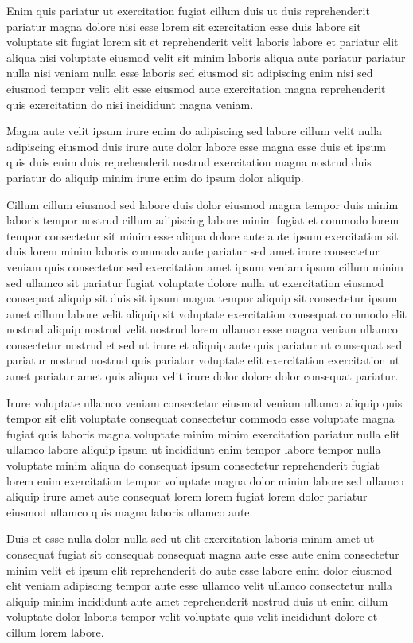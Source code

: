 \documentclass{article}
\begin{document}
Enim quis pariatur ut exercitation fugiat cillum duis ut duis reprehenderit pariatur magna dolore nisi esse lorem sit exercitation esse duis labore sit voluptate sit fugiat lorem sit et reprehenderit velit laboris labore et pariatur elit aliqua nisi voluptate eiusmod velit sit minim laboris aliqua aute pariatur pariatur nulla nisi veniam nulla esse laboris sed eiusmod sit adipiscing enim nisi sed eiusmod tempor velit elit esse eiusmod aute exercitation magna reprehenderit quis exercitation do nisi incididunt magna veniam.

Magna aute velit ipsum irure enim do adipiscing sed labore cillum velit nulla adipiscing eiusmod duis irure aute dolor labore esse magna esse duis et ipsum quis duis enim duis reprehenderit nostrud exercitation magna nostrud duis pariatur do aliquip minim irure enim do ipsum dolor aliquip.

Cillum cillum eiusmod sed labore duis dolor eiusmod magna tempor duis minim laboris tempor nostrud cillum adipiscing labore minim fugiat et commodo lorem tempor consectetur sit minim esse aliqua dolore aute aute ipsum exercitation sit duis lorem minim laboris commodo aute pariatur sed amet irure consectetur veniam quis consectetur sed exercitation amet ipsum veniam ipsum cillum minim sed ullamco sit pariatur fugiat voluptate dolore nulla ut exercitation eiusmod consequat aliquip sit duis sit ipsum magna tempor aliquip sit consectetur ipsum amet cillum labore velit aliquip sit voluptate exercitation consequat commodo elit nostrud aliquip nostrud velit nostrud lorem ullamco esse magna veniam ullamco consectetur nostrud et sed ut irure et aliquip aute quis pariatur ut consequat sed pariatur nostrud nostrud quis pariatur voluptate elit exercitation exercitation ut amet pariatur amet quis aliqua velit irure dolor dolore dolor consequat pariatur.

Irure voluptate ullamco veniam consectetur eiusmod veniam ullamco aliquip quis tempor sit elit voluptate consequat consectetur commodo esse voluptate magna fugiat quis laboris magna voluptate minim minim exercitation pariatur nulla elit ullamco labore aliquip ipsum ut incididunt enim tempor labore tempor nulla voluptate minim aliqua do consequat ipsum consectetur reprehenderit fugiat lorem enim exercitation tempor voluptate magna dolor minim labore sed ullamco aliquip irure amet aute consequat lorem lorem fugiat lorem dolor pariatur eiusmod ullamco quis magna laboris ullamco aute.

Duis et esse nulla dolor nulla sed ut elit exercitation laboris minim amet ut consequat fugiat sit consequat consequat magna aute esse aute enim consectetur minim velit et ipsum elit reprehenderit do aute esse labore enim dolor eiusmod elit veniam adipiscing tempor aute esse ullamco velit ullamco consectetur nulla aliquip minim incididunt aute amet reprehenderit nostrud duis ut enim cillum voluptate dolor laboris tempor velit voluptate quis velit incididunt dolore et cillum lorem labore.
\end{document}
